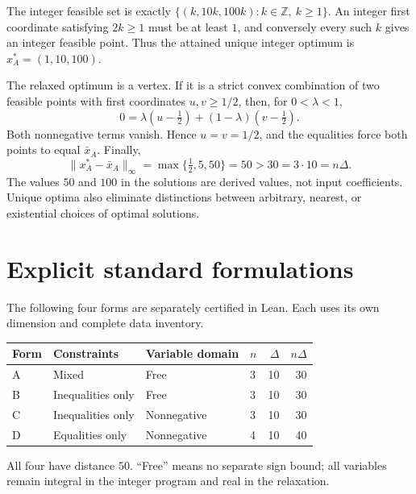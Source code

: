 \documentclass[10pt]{article}
\begin{document}
The integer feasible set is exactly
$\{(k,10k,100k): k\in\mathbb Z,\ k\ge1\}$.
An integer first coordinate satisfying $2k\ge1$ must be at least $1$, and conversely every such $k$ gives an integer feasible point. Thus the attained unique integer optimum is $x_A^*=(1,10,100)$.

The relaxed optimum is a vertex. If it is a strict convex combination of two feasible points with first coordinates $u,v\ge1/2$, then, for $0<\lambda<1$,
\[
 0=\lambda(u-\tfrac12)+(1-\lambda)(v-\tfrac12).
\]
Both nonnegative terms vanish. Hence $u=v=1/2$, and the equalities force both points to equal $\bar x_A$. Finally,
\[
 \boxed{\|x_A^*-\bar x_A\|_\infty
 =\max\{\tfrac12,5,50\}=50>30=3\cdot10=n\Delta.}
\]
The values $50$ and $100$ in the solutions are derived values, not input coefficients. Unique optima also eliminate distinctions between arbitrary, nearest, or existential choices of optimal solutions.

\section{Explicit standard formulations}
The following four forms are separately certified in Lean. Each uses its own dimension and complete data inventory.
\begin{center}
\begin{tabular}{@{}llllrr@{}}
\toprule
Form & Constraints & Variable domain & $n$ & $\Delta$ & $n\Delta$\\
\midrule
A & Mixed & Free & 3 & 10 & 30\\
B & Inequalities only & Free & 3 & 10 & 30\\
C & Inequalities only & Nonnegative & 3 & 10 & 30\\
D & Equalities only & Nonnegative & 4 & 10 & 40\\
\bottomrule
\end{tabular}
\end{center}
All four have distance $50$. ``Free'' means no separate sign bound; all variables remain integral in the integer program and real in the relaxation.
\end{document}
